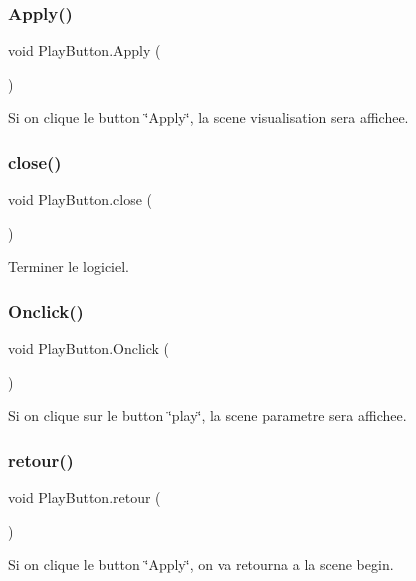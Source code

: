 \subsubsection{\texorpdfstring{Apply()}{Apply()}}
{\footnotesize\ttfamily void Play\+Button.\+Apply (\begin{DoxyParamCaption}{ }\end{DoxyParamCaption})\hspace{0.3cm}{\ttfamily [inline]}}



Si on clique le button \char`\"{}\+Apply\char`\"{}, la scene visualisation sera affichee. 

\mbox{\label{class_play_button_a53fd8894bbfa2d9ee15aab0d619e2bf0}} 
\subsubsection{\texorpdfstring{close()}{close()}}
{\footnotesize\ttfamily void Play\+Button.\+close (\begin{DoxyParamCaption}{ }\end{DoxyParamCaption})\hspace{0.3cm}{\ttfamily [inline]}}



Terminer le logiciel. 

\mbox{\label{class_play_button_ae50ebca92c570fc8eb2cdaa79eff1865}} 
\subsubsection{\texorpdfstring{Onclick()}{Onclick()}}
{\footnotesize\ttfamily void Play\+Button.\+Onclick (\begin{DoxyParamCaption}{ }\end{DoxyParamCaption})\hspace{0.3cm}{\ttfamily [inline]}}



Si on clique sur le button \char`\"{}play\char`\"{}, la scene parametre sera affichee. 

\mbox{\label{class_play_button_ac5294990a15a4265444183ddf5fa2c58}} 
\subsubsection{\texorpdfstring{retour()}{retour()}}
{\footnotesize\ttfamily void Play\+Button.\+retour (\begin{DoxyParamCaption}{ }\end{DoxyParamCaption})\hspace{0.3cm}{\ttfamily [inline]}}



Si on clique le button \char`\"{}\+Apply\char`\"{}, on va retourna a la scene begin. 

